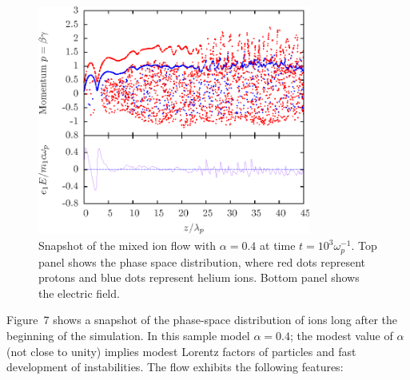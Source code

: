 
\begin{figure}[h]
\begin{center}
\includegraphics[width=0.8\textwidth]{pics/chap2/f7.eps}
\caption[Snapshot of mixed ion flow]{Snapshot of the mixed ion flow with
  $\alpha=0.4$ at time $t = 10^3\omega^{-1}_p$. Top panel shows the phase space
  distribution, where red dots represent protons and blue dots represent helium
  ions. Bottom panel shows the electric field. }
\label{fig:2stream}
\end{center}
\end{figure}

Figure~7 shows a snapshot of the phase-space distribution of ions long after
the beginning of the simulation. In this sample model $\alpha=0.4$; the
modest value of $\alpha$ (not close to unity) implies modest Lorentz factors
of particles and fast development of instabilities.
%
The flow exhibits the following features:

